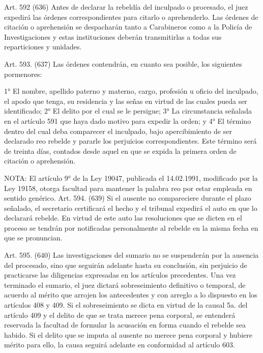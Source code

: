     Art. 592 (636) Antes de declarar la rebeldía del inculpado o procesado, el juez expedirá las órdenes correspondientes para citarlo o aprehenderlo.
    Las órdenes de citación o aprehensión se despacharán tanto a Carabineros como a la Policía de Investigaciones y estas instituciones deberán transmitirlas a todas sus reparticiones y unidades.



    Art. 593. (637) Las órdenes contendrán, en cuanto sea posible, los siguientes pormenores:

    1° El nombre, apellido paterno y materno, cargo, profesión u oficio del inculpado, el apodo que tenga, su residencia y las señas en virtud de las cuales pueda ser identificado;
    2° El delito por el cual se le persigue;
    3° La circunstancia señalada en el artículo 591 que haya dado motivo para expedir la orden; y
    4° El término dentro del cual deba comparecer el inculpado, bajo apercibimiento de ser declarado reo rebelde y pararle los perjuicios correspondientes. Este término será de treinta días, contados desde aquel en que se expida la primera orden de citación o aprehensión.


NOTA:
    El artículo 9° de la Ley 19047, publicada el 14.02.1991, modificado por la Ley 19158, otorga facultad para mantener la palabra reo por estar empleada en sentido genérico.
    Art. 594. (639) Si el ausente no compareciere durante el plazo señalado, el secretario certificará el hecho y el tribunal expedirá el auto en que lo declarará rebelde.
    En virtud de este auto las resoluciones que se dicten en el proceso se tendrán por notificadas personalmente al rebelde en la misma fecha en que se pronuncian.

    Art. 595. (640) Las investigaciones del sumario no se suspenderán por la ausencia del procesado, sino que seguirán adelante hasta su conclusión, sin perjuicio de practicarse las diligencias expresadas en los artículos precedentes. Una vez terminado el sumario, el juez dictará sobreseimiento definitivo o temporal, de acuerdo al mérito que arrojen los antecedentes y con arreglo a lo dispuesto en los artículos 408 y 409.
    Si el sobreseimiento se dicta en virtud de la causal 5a. del artículo 409 y el delito de que se trata merece pena corporal, se entenderá reservada la facultad de formular la acusación en forma cuando el rebelde sea habido.
    Si el delito que se imputa al ausente no merece pena corporal y hubiere mérito para ello, la causa seguirá adelante en conformidad al artículo 603.



